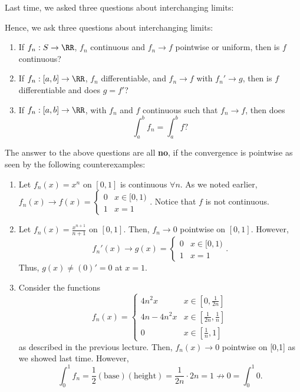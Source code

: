Last time, we asked three questions about interchanging limits:
\begin{question}
Hence, we ask three questions about interchanging limits:
\begin{enumerate}
\item If $f_n:S\to \RR$, $f_n$ continuous and $f_n\to f$ pointwise or uniform, then is $f$ continuous?
\item If $f_n:[a,b]\to \RR$, $f_n$ differentiable, and $f_n\to f$ with $f_n'\to g$, then is $f$ differentiable and does $g=f'$?
\item If $f_n:[a,b]\to \RR$, with $f_n$ and $f$ continuous such that $f_n\to f$, then does 
\[
\int_a^b f_n = \int_a^b f?
\]
\end{enumerate}
\end{question}
The answer to the above questions are all \textbf{no}, if the convergence is pointwise as seen by the following counterexamples:
\begin{enumerate}
    \item Let $f_n(x) = x^n$ on $[0,1]$ is continuous $\forall n$. As we noted earlier, $f_n(x) \to f(x) =  \begin{cases} 0 & x\in [0,1) \\
    1 & x=1
    \end{cases}$. Notice that $f$ is not continuous.
    
    \item Let $f_n(x) = \frac{x^{n+1}}{n+1}$ on $[0,1]$. Then, $f_n\to 0$ pointwise on $[0,1]$. However, 
    \[
    f_n'(x) \to g(x) = \begin{cases}
    0 &x\in[0,1) \\
    1 & x=1
    \end{cases}.
    \]
    Thus, $g(x) \neq (0)' = 0$ at $x=1$.
    
    \item Consider the functions
    \[
    f_n(x) =\begin{cases}
    4n^2x & x\in \left[0,\frac{1}{2n}\right] \\
    4n-4n^2x & x\in \left[\frac{1}{2n}, \frac{1}{n}\right] \\
    0 & x\in \left[\frac{1}{n}, 1\right]
    \end{cases}
    \]
    as described in the previous lecture. Then, $f_n(x)\to 0$ pointwise on [0,1] as we showed last time. However,
    \[
    \int_0^1 f_n = \frac{1}{2}(\text{base})(\text{height}) = \frac{1}{2n}\cdot 2n = 1\not\to 0 = \int_0^1 0.
    \]
\end{enumerate}

